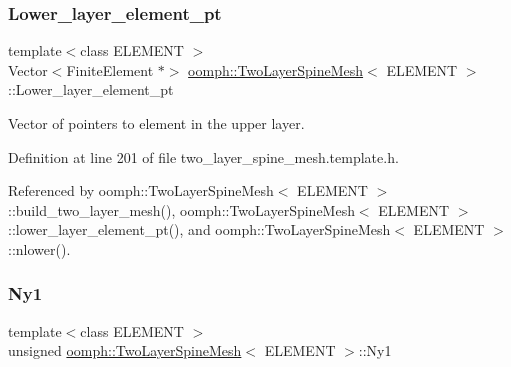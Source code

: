 \mbox{\label{classoomph_1_1TwoLayerSpineMesh_aaadaab14aab4d597dab78758a1a93ad8}} 
\subsubsection{\texorpdfstring{Lower\+\_\+layer\+\_\+element\+\_\+pt}{Lower\_layer\_element\_pt}}
{\footnotesize\ttfamily template$<$class E\+L\+E\+M\+E\+NT $>$ \\
Vector$<$Finite\+Element $\ast$$>$ \hyperlink{classoomph_1_1TwoLayerSpineMesh}{oomph\+::\+Two\+Layer\+Spine\+Mesh}$<$ E\+L\+E\+M\+E\+NT $>$\+::Lower\+\_\+layer\+\_\+element\+\_\+pt\hspace{0.3cm}{\ttfamily [protected]}}



Vector of pointers to element in the upper layer. 



Definition at line 201 of file two\+\_\+layer\+\_\+spine\+\_\+mesh.\+template.\+h.



Referenced by oomph\+::\+Two\+Layer\+Spine\+Mesh$<$ E\+L\+E\+M\+E\+N\+T $>$\+::build\+\_\+two\+\_\+layer\+\_\+mesh(), oomph\+::\+Two\+Layer\+Spine\+Mesh$<$ E\+L\+E\+M\+E\+N\+T $>$\+::lower\+\_\+layer\+\_\+element\+\_\+pt(), and oomph\+::\+Two\+Layer\+Spine\+Mesh$<$ E\+L\+E\+M\+E\+N\+T $>$\+::nlower().

\mbox{\label{classoomph_1_1TwoLayerSpineMesh_a614e800b8c5ba2963254e7e41bcfc9e2}} 
\subsubsection{\texorpdfstring{Ny1}{Ny1}}
{\footnotesize\ttfamily template$<$class E\+L\+E\+M\+E\+NT $>$ \\
unsigned \hyperlink{classoomph_1_1TwoLayerSpineMesh}{oomph\+::\+Two\+Layer\+Spine\+Mesh}$<$ E\+L\+E\+M\+E\+NT $>$\+::Ny1\hspace{0.3cm}{\ttfamily [protected]}}



